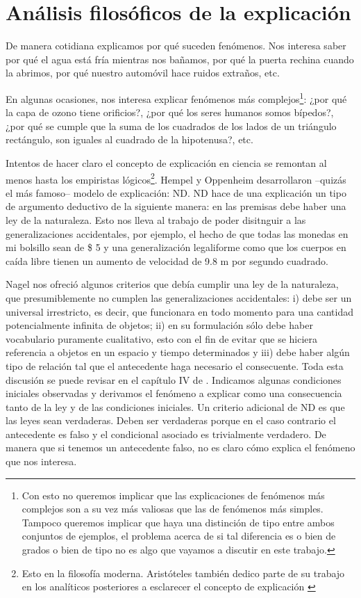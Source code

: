 \section{Análisis filosóficos de la explicación}

\noindent De manera cotidiana explicamos por qué suceden fenómenos. Nos interesa saber por qué el agua está fría mientras nos bañamos, por qué la puerta rechina cuando la abrimos, por qué nuestro automóvil hace ruidos extraños, etc.

En algunas ocasiones, nos interesa explicar fenómenos más complejos\footnote{Con esto no queremos implicar que las explicaciones de fenómenos más complejos son a su vez más valiosas que las de fenómenos más simples. Tampoco queremos implicar que haya una distinción de tipo entre ambos conjuntos de ejemplos, el problema acerca de si tal diferencia es o bien de grados o bien de tipo no es algo que vayamos a discutir en este trabajo.}: ¿por qué la capa de ozono tiene orificios?, ¿por qué los seres humanos somos bípedos?, ¿por qué se cumple que la suma de los cuadrados de los lados de un triángulo rectángulo, son iguales al cuadrado de la hipotenusa?, etc.

Intentos de hacer claro el concepto de explicación en ciencia se remontan al menos hasta los empiristas lógicos\footnote{Esto en la filosofía moderna. Aristóteles también dedico parte de su trabajo en los analíticos posteriores a esclarecer el concepto de explicación \cite{Aristoteles2009}}. Hempel y Oppenheim desarrollaron --quizás el más famoso-- modelo de explicación: ND. ND hace de una explicación un tipo de argumento deductivo de la siguiente manera: en las premisas debe haber una ley de la naturaleza. Esto nos lleva al trabajo de poder disitnguir a las generalizaciones accidentales, por ejemplo, el hecho de que todas las monedas en mi bolsillo sean de \$ 5 y una generalización legaliforme como que los cuerpos en caída libre tienen un aumento de velocidad de 9.8 m por segundo cuadrado.

Nagel nos ofreció algunos criterios que debía cumplir una ley de la naturaleza, que presumiblemente no cumplen las generalizaciones accidentales: i) debe ser un universal irrestricto, es decir, que funcionara en todo momento para una cantidad potencialmente infinita de objetos; ii) en su formulación sólo debe haber vocabulario puramente cualitativo, esto con el fin de evitar que se hiciera referencia a objetos en un espacio y tiempo determinados y iii) debe haber algún tipo de relación tal que el antecedente haga necesario el consecuente. Toda esta discusión se puede revisar en el capítulo IV de \cite{Nagel2006}. Indicamos algunas condiciones iniciales observadas y derivamos el fenómeno a explicar como una consecuencia tanto de la ley y de las condiciones iniciales. Un criterio adicional de ND es que las leyes sean verdaderas. Deben ser verdaderas porque en el caso contrario el antecedente es falso y el condicional asociado es trivialmente verdadero. De manera que si tenemos un antecedente falso, no es claro cómo explica el fenómeno que nos interesa.

